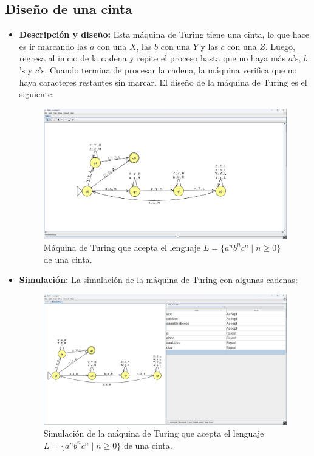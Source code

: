 \documentclass[11pt]{report}
\begin{document}
\subsection{Diseño de una cinta}
\begin{itemize}
  \item \textbf{Descripción y diseño:} Esta máquina de Turing tiene una cinta, lo que hace es ir marcando las $a$ con
        una $X$, las $b$ con una $Y$ y las $c$ con una $Z$. Luego, regresa al inicio de
        la cadena y repite el proceso hasta que no haya más $a$'s, $b$'s y $c$'s.
        Cuando termina de procesar la cadena, la máquina verifica que no haya
        caracteres restantes sin marcar. El diseño de la máquina de Turing es el siguiente:

        \begin{figure}[H]
          \centering
          \includegraphics[scale=0.33]{img/MT_01_one_ribbon.png}
          \caption{Máquina de Turing que acepta el lenguaje $L = \{a^nb^nc^n \mid n \geq 0\}$ de una cinta.}
          \label{fig:maquina de turing que acepta el lenguaje L = {a^nb^nc^n | n >= 0}}
        \end{figure}

        \newpage

  \item \textbf{Simulación:} La simulación de la máquina de Turing con algunas cadenas:
        \begin{figure}[H]
          \centering
          \includegraphics[scale=0.33]{img/MT_01_one_ribbon_simulation.png}
          \caption{Simulación de la máquina de Turing que acepta el lenguaje $L = \{a^nb^nc^n \mid n \geq 0\}$ de una cinta.}
          \label{fig:simulacion de la maquina de turing que acepta el lenguaje L = {a^nb^nc^n | n >= 0}}
        \end{figure}
\end{itemize}
\end{document}
